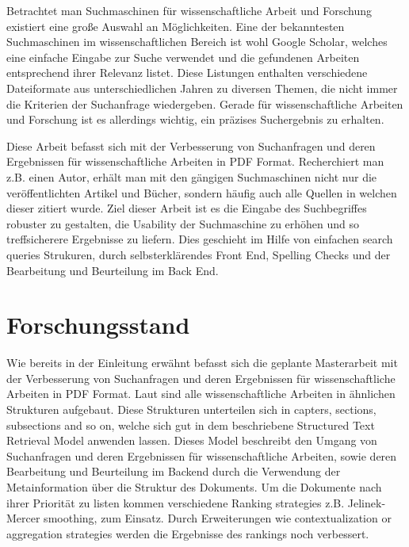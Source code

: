 \documentclass[
a4paper,     %
12pt         %
]{scrartcl}  %
\begin{document}
Betrachtet man Suchmaschinen für wissenschaftliche Arbeit und Forschung existiert eine große Auswahl an Möglichkeiten. Eine der bekanntesten Suchmaschinen im wissenschaftlichen Bereich ist wohl Google
Scholar, welches eine einfache Eingabe zur Suche verwendet und die gefundenen Arbeiten entsprechend ihrer Relevanz listet. Diese Listungen enthalten verschiedene Dateiformate aus unterschiedlichen Jahren zu 
diversen Themen, die nicht immer die Kriterien der Suchanfrage wiedergeben. Gerade für wissenschaftliche Arbeiten und Forschung ist es allerdings wichtig, ein präzises Suchergebnis zu erhalten. 

Diese Arbeit befasst sich mit der Verbesserung von Suchanfragen und deren Ergebnissen für wissenschaftliche Arbeiten in PDF Format. Recherchiert man z.B. einen Autor, erhält man mit den gängigen Suchmaschinen
nicht nur die veröffentlichten Artikel und Bücher, sondern häufig auch alle Quellen in welchen dieser zitiert wurde. Ziel dieser Arbeit ist es die Eingabe des Suchbegriffes robuster zu gestalten, die 
Usability der Suchmaschine zu erhöhen und so treffsicherere Ergebnisse zu liefern. Dies geschieht im Hilfe von einfachen search queries Strukuren, durch selbsterklärendes Front End, Spelling Checks und 
der Bearbeitung und Beurteilung im Back End. 

\section{Forschungsstand}

Wie bereits in der Einleitung erwähnt befasst sich die geplante Masterarbeit mit der Verbesserung von Suchanfragen und deren Ergebnissen für wissenschaftliche Arbeiten in PDF Format. Laut \cite{SK14} sind 
alle wissenschaftliche Arbeiten in ähnlichen Strukturen aufgebaut. Diese Strukturen unterteilen sich in capters, sections, subsections and so on, welche sich gut in dem \cite{RBY99} beschriebene 
Structured Text Retrieval Model anwenden lassen. Dieses Model beschreibt den Umgang von Suchanfragen und deren Ergebnissen für wissenschaftliche Arbeiten, sowie deren Bearbeitung und Beurteilung im 
Backend durch die Verwendung der Metainformation über die Struktur des Dokuments. Um die Dokumente nach ihrer Priorität zu listen kommen verschiedene Ranking strategies z.B. Jelinek-Mercer smoothing, zum 
Einsatz. Durch Erweiterungen wie contextualization or aggregation strategies werden die Ergebnisse des rankings noch verbessert.


\end{document}
